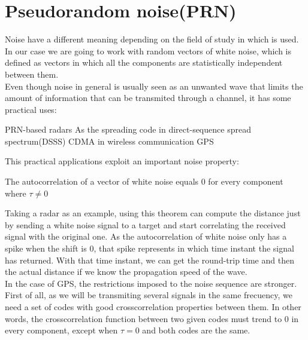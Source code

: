 \section{Pseudorandom noise(PRN)}

Noise have a different meaning depending on the field of study in which is
used. In our case we are going to work with random vectors of white noise,
which is defined as vectors in which all the components are statistically
independent between them.\cite{white_noise}\\

Even though noise in general is usually seen as an unwanted wave that
limits the amount of information that can be transmited through a
channel\cite{shannon_noise}, it has some practical uses:


\begin{outline}
  \1 PRN-based radars\cite{prn_radar_example1}\cite{prn_radar_example2}
  \1 As the spreading code in direct-sequence spread spectrum(DSSS) \cite{DSSS_1}\cite{DSSS}
    \2 CDMA in wireless communication\cite{DSSS}
    \2 GPS\cite{GPS}
\end{outline}

This practical applications exploit an important noise property:

\begin{property}
  The autocorrelation of a vector of white noise equals 0 for every component
  where $\tau \neq 0$ \cite{everett}
\end{property}

Taking a radar as an example, using this theorem can compute the distance
just by sending a white noise signal to a target and start correlating the
received signal with the original one. As the autocorrelation of
white noise only has a spike when the shift is 0, that spike represents in
which time instant the signal has returned. With that time instant, we can
get the round-trip time and then the actual distance if we know the
propagation speed of the wave.\\

In the case of GPS, the restrictions imposed to the noise sequence are
stronger. First of all, as we will be transmiting several signals in the same
frecuency, we need a set of codes with good crosscorrelation properties
between them. In other words, the crosscorrelation function between two given
codes must trend to 0 in every component, except when $\tau = 0$ and
both codes are the same.\\


